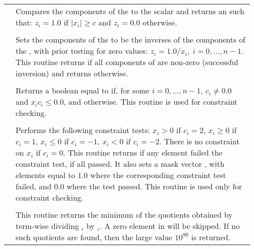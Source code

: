 \begin{supertabular}{|p{\colone}|p{\coltwo}|}
& Compares the components of the   to the scalar
 and returns an   such that:
$z_i = 1.0$ if $| x_i | \ge c$ and $z_i = 0.0$ otherwise.
\\
%
 &  \\
& Sets the components of the   to be the inverses
of the components of the  , with prior testing
for zero values:
$z_i = 1.0 /  x_i  , \: i=0,\ldots,n-1$.
This routine returns  if all components of  are
non-zero (successful inversion) and returns  otherwise.  
\\
%
 &  \\
& Returns a boolean equal to  if, for some
$i=0,\ldots,n-1$, 
$c_i \ne 0.0$ and $x_i c_i \le 0.0$, and  otherwise.
This routine is used for constraint checking.
\\
%
 &  \\
& Performs the following constraint tests:
$x_i > 0$ if $c_i=2$,
$x_i \ge 0$ if $c_i=1$,
$x_i \le 0$ if $c_i=-1$,
$x_i < 0$ if $c_i=-2$.
There is no constraint on $x_i$ if $c_i=0$.
This routine returns  if any element failed
the constraint test,  if all passed.  It also sets a
mask vector , with elements equal to $1.0$ where the
corresponding constraint test failed, and $0.0$
where the test passed.
This routine is used only for constraint checking.
\\
%
 &  \\
& This routine returns the minimum of the quotients obtained   
by term-wise dividing $_i$ by $_i$. 
A zero element in  will be skipped. 
If no such quotients are found, then the large value $10^{99}$ is returned. 
\\
%
\end{supertabular}
\bigskip
